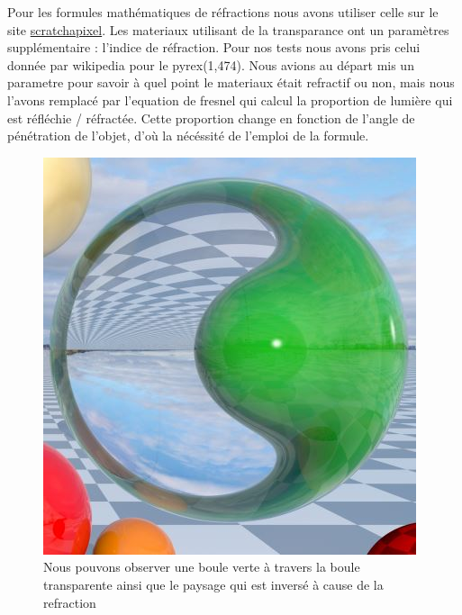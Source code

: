 Pour les formules mathématiques de réfractions nous avons utiliser celle sur le site \href{https://www.scratchapixel.com/lessons/3d-basic-rendering/introduction-to-shading/reflection-refraction-fresnel}{scratchapixel}.
Les materiaux utilisant de la transparance ont un paramètres supplémentaire : l'indice de réfraction. Pour nos tests nous avons pris celui donnée par wikipedia pour le pyrex(1,474). Nous avions au départ mis un parametre pour savoir à quel point le materiaux était refractif ou non, mais nous l'avons remplacé par l'equation de fresnel qui calcul la proportion de lumière qui est réfléchie / réfractée. Cette proportion change en fonction de l'angle de pénétration de l'objet, d'où la nécéssité de l'emploi de la formule.

\begin{figure}[h]
   \begin{center}
       \includegraphics[scale=0.8]{img/rt/refractions.jpg}
   \end{center}
   \caption{Nous pouvons observer une boule verte à travers la boule transparente ainsi que le paysage qui est inversé à cause de la refraction}
\end{figure}

